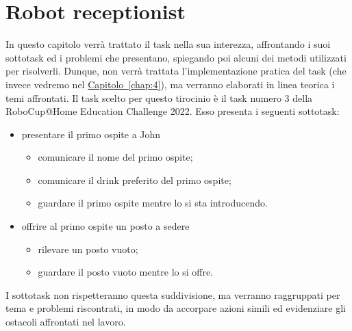 \documentclass[italian, twoside]{sapthesis} %
\begin{document}
\chapter{Robot receptionist}
\label{chap:3}
\lettrine[lines=2, findent=3pt, nindent=0pt]{I}{}n questo capitolo verrà trattato il task nella sua interezza, affrontando i suoi sottotask ed i problemi che presentano, spiegando poi alcuni dei metodi utilizzati per risolverli. Dunque, non verrà trattata l'implementazione pratica del task (che invece vedremo nel \hyperref[chap:4]{Capitolo~\ref*{chap:4}}), ma verranno elaborati in linea teorica i temi affrontati. Il task scelto per questo tirocinio è il task numero 3 della RoboCup@Home Education Challenge 2022. Esso presenta i seguenti sottotask:

\begin{itemize}
	\item presentare il primo ospite a John
	\begin{itemize}
	    \item comunicare il nome del primo ospite;
	    \item comunicare il drink preferito del primo ospite;
	    \item guardare il primo ospite mentre lo si sta introducendo.
    \end{itemize}
	\item offrire al primo ospite un posto a sedere
	\begin{itemize}
	    \item rilevare un posto vuoto;
	    \item guardare il posto vuoto mentre lo si offre.
    \end{itemize}
\end{itemize}

I sottotask non rispetteranno questa suddivisione, ma verranno raggruppati per tema e problemi riscontrati, in modo da accorpare azioni simili ed evidenziare gli ostacoli affrontati nel lavoro.
\end{document}
